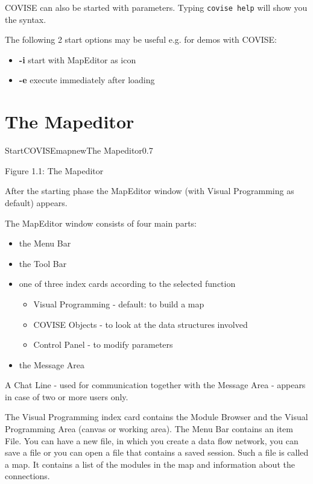COVISE can also be started with parameters. Typing  \verb/covise help/  will show you the syntax. 

\vspace{0.5cm}

The following 2 start options may be useful e.g. for demos with COVISE:
\begin{itemize}
\item {\bf -i}  start with MapEditor as icon
\item {\bf -e}  execute immediately after loading
\end{itemize}

\section{The Mapeditor}

\begin{covimg}{StartCOVISE}{mapnew}{The Mapeditor}{0.7}\end{covimg}

\begin{htmlonly}
Figure 1.1: The Mapeditor 
\vspace{0.5cm}
\end{htmlonly}

After the starting phase the MapEditor window (with Visual Programming as default) appears.

 
The MapEditor window consists of four main parts: 

\begin{itemize}
\item the Menu Bar 
\item the Tool Bar
\item one of three index cards according to the selected function
  \begin{itemize}
  \item Visual Programming - default: to build a map
  \item COVISE Objects - to look at the data structures involved
  \item Control Panel - to modify parameters
  \end{itemize} 
\item the Message Area 
\end{itemize}

A Chat Line - used for communication together with the Message Area - appears in case of
two or more users only.

The Visual Programming index card contains the Module Browser and the Visual Programming Area (canvas or
working area). 
The Menu Bar contains an item File. You can have a new file, in which you create a 
data flow network, you can save a file or you can open a file that contains a saved 
session. Such a file is called a map. It contains a list of the modules in the map and information
about the connections. 

